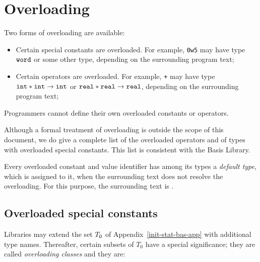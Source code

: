 %

\section{Overloading}
\label{overload.sec}
Two forms of overloading are available:
\begin{itemize}
\item Certain special constants are overloaded.  For example,
{\tt 0w5} may have type $\mbox{\tt word}$ or some other type, depending on
the surrounding program text;
\item Certain operators are overloaded. For example,
{\tt +} may have type $\mbox{\tt int}\ast\mbox{\tt int}\to\mbox{\tt int}$ or
$\mbox{\tt real}\ast\mbox{\tt real}\to\mbox{\tt real}$, depending on
the surrounding program text;
\end{itemize}
Programmers cannot define their own overloaded constants or operators.

Although a formal treatment of overloading is outside the scope
of this document, we do give a complete list of the overloaded operators
and of types with overloaded special constants.
This list is consistent with the Basis Library\cite{sml-basis-lib}.

Every overloaded constant and value identifier has among its types a
{\em default type},
which is assigned to it,
when the surrounding text does not resolve the overloading.
For this purpose, the surrounding text is .

\subsection{Overloaded special constants}
Libraries may extend the set $T_0$ of
Appendix~\ref{init-stat-bas-app} with additional type names. Thereafter, certain
subsets of $T_0$ have a special significance;
they are called {\sl overloading classes}
and they are:\medskip


